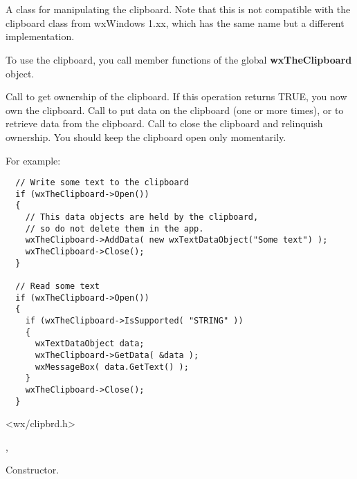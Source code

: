 \section{}\label{wxclipboard}

A class for manipulating the clipboard. Note that this is not compatible with the
clipboard class from wxWindows 1.xx, which has the same name but a different implementation.

To use the clipboard, you call member functions of the global {\bf wxTheClipboard} object.

Call  to get ownership of the clipboard. If this operation returns TRUE, you
now own the clipboard. Call  to put data
on the clipboard (one or more times), or  to
retrieve data from the clipboard. Call  to close
the clipboard and relinquish ownership. You should keep the clipboard open only momentarily.

For example:

\begin{verbatim}
  // Write some text to the clipboard
  if (wxTheClipboard->Open())
  {
    // This data objects are held by the clipboard, 
    // so do not delete them in the app.
    wxTheClipboard->AddData( new wxTextDataObject("Some text") );
    wxTheClipboard->Close();
  }

  // Read some text
  if (wxTheClipboard->Open())
  {
    if (wxTheClipboard->IsSupported( "STRING" ))
    {
      wxTextDataObject data;
      wxTheClipboard->GetData( &data );
      wxMessageBox( data.GetText() );
    }  
    wxTheClipboard->Close();
  }
\end{verbatim}




<wx/clipbrd.h>


, 




Constructor.

